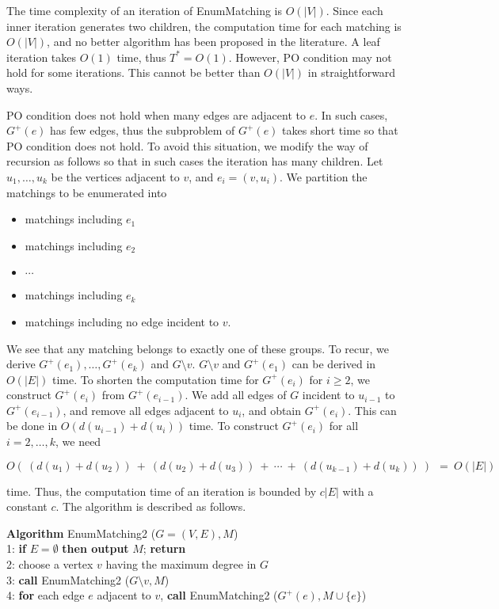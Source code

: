 \documentclass{llncs}
\begin{document}
\noindent
The time complexity of an iteration of EnumMatching is $O(|V|)$.
Since each inner iteration generates two children, the computation
 time for each matching is $O(|V|)$, and no better algorithm
 has been proposed in the literature.
A leaf iteration takes $O(1)$ time, thus $T^* = O(1)$.
However, PO condition may not hold for some iterations.
This cannot be better than $O(|V|)$ in straightforward ways.

PO condition does not hold when many edges are adjacent to $e$.
In such cases, $G^+(e)$ has few edges, thus the subproblem of
 $G^+(e)$ takes short time so that PO condition does not hold.
To avoid this situation, we modify the way of recursion as follows
 so that in such cases the iteration has many children.
Let $u_1,\ldots,u_k$ be the vertices adjacent to $v$, and $e_i = (v,u_i)$.
We partition the matchings to be enumerated into 

\vspace{-1mm}
\begin{itemize}
\item matchings including $e_1$
\item matchings including $e_2$
\item $\cdots$
\item matchings including $e_k$
\item matchings including no edge incident to $v$.
\end{itemize}
\vspace{-1mm}

We see that any matching belongs to exactly one of these groups.
To recur, we derive $G^+(e_1),\ldots,G^+(e_k)$ and $G\setminus v$.
$G\setminus v$ and $G^+(e_1)$ can be derived in $O(|E|)$ time.
To shorten the computation time for $G^+(e_i)$ for $i\ge 2$, 
 we construct $G^+(e_i)$ from $G^+(e_{i-1})$.
We add all edges of $G$ incident to $u_{i-1}$ to $G^+(e_{i-1})$,
 and remove all edges adjacent to $u_i$, and obtain $G^+(e_i)$.
This can be done in $O(d(u_{i-1})+d(u_i))$ time.
To construct $G^+(e_i)$ for all $i=2,\ldots,k$, we need 

\vspace{-1mm}
\[ O(\ (d(u_1)+d(u_2))\ +\ (d(u_2)+d(u_3))\ +\ \cdots\ +\ 
 (d(u_{k-1})+d(u_k))\ )\ \ =\ O(|E|) \]
\vspace{-3mm}

\noindent
time.
Thus, the computation time of an iteration is bounded by $c|E|$
 with a constant $c$.
The algorithm is described as follows.

\begin{tabbing}
{\bf Algorithm} EnumMatching2 ($G=(V,E), M$)\\
1: {\bf if} $E = \emptyset$ {\bf then output} $M$; {\bf return}\\
2: choose a vertex $v$ having the maximum degree in $G$\\
3: {\bf call} EnumMatching2 ($G\setminus v, M$)\\
4: {\bf for} each edge $e$ adjacent to $v$,
 {\bf call} EnumMatching2 ($G^+(e), M\cup \{ e\}$)
\end{tabbing}
\end{document}
